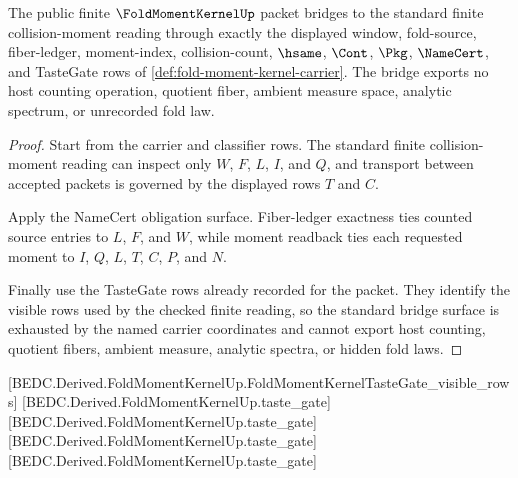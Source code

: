 \begin{theorem}
\label{thm:fold-moment-kernel-standard-bridge-surface}
The public finite $\FoldMomentKernelUp$ packet bridges to the standard finite collision-moment reading through exactly the displayed window, fold-source, fiber-ledger, moment-index, collision-count, $\hsame$, $\Cont$, $\Pkg$, $\NameCert$, and TasteGate rows of \autoref{def:fold-moment-kernel-carrier}. The bridge exports no host counting operation, quotient fiber, ambient measure space, analytic spectrum, or unrecorded fold law.
\end{theorem}
\begin{proof}
Start from the carrier and classifier rows. The standard finite collision-moment reading can inspect only $W$, $F$, $L$, $I$, and $Q$, and transport between accepted packets is governed by the displayed rows $T$ and $C$.

Apply the NameCert obligation surface. Fiber-ledger exactness ties counted source entries to $L$, $F$, and $W$, while moment readback ties each requested moment to $I$, $Q$, $L$, $T$, $C$, $P$, and $N$.

Finally use the TasteGate rows already recorded for the packet. They identify the visible rows used by the checked finite reading, so the standard bridge surface is exhausted by the named carrier coordinates and cannot export host counting, quotient fibers, ambient measure, analytic spectra, or hidden fold laws.
\end{proof}

[BEDC.Derived.FoldMomentKernelUp.FoldMomentKernelTasteGate\_visible\_rows]
[BEDC.Derived.FoldMomentKernelUp.taste\_gate]
[BEDC.Derived.FoldMomentKernelUp.taste\_gate]
[BEDC.Derived.FoldMomentKernelUp.taste\_gate]
[BEDC.Derived.FoldMomentKernelUp.taste\_gate]

\begin{closurestatus}{\FoldMomentKernelUp}
  \theoryclosure{\matureClosure}
  \formalstatus{\theoremCheckedV}
\end{closurestatus}

